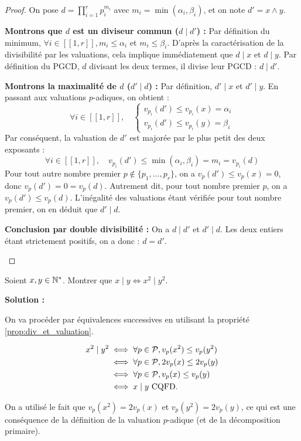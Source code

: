 \documentclass[12pt, a4paper]{report}
\begin{document}
\begin{proof}
    On pose $d = \prod_{i=1}^r p_i^{m_i}$ avec $m_i = \min(\alpha_i,\beta_i)$, et on note $d' = x \wedge y$.
    
    \begin{outline}
        \1 \textbf{Montrons que $d$ est un diviseur commun ($d \mid d'$) :}
            \2 Par définition du minimum, $\forall i \in [\![1, r]\!], m_i \le \alpha_i$ et $m_i \le \beta_i$.
            \2 D'après la caractérisation de la divisibilité par les valuations, cela implique immédiatement que $d \mid x$ et $d \mid y$.
            \2 Par définition du PGCD, $d$ divisant les deux termes, il divise leur PGCD : $d \mid d'$.

        \1 \textbf{Montrons la maximalité de $d$ ($d' \mid d$) :}
            \2 Par définition, $d' \mid x$ et $d' \mid y$. En passant aux valuations $p$-adiques, on obtient :
               \[ \forall i \in [\![1, r]\!], \quad \begin{cases} v_{p_i}(d') \le v_{p_i}(x) = \alpha_i \\ v_{p_i}(d') \le v_{p_i}(y) = \beta_i \end{cases} \]
            \2 Par conséquent, la valuation de $d'$ est majorée par le plus petit des deux exposants :
               \[ \forall i \in [\![1, r]\!], \quad v_{p_i}(d') \le \min(\alpha_i, \beta_i) = m_i = v_{p_i}(d) \]
            \2 Pour tout autre nombre premier $p \notin \{p_1, \dots, p_r\}$, on a $v_p(d') \le v_p(x) = 0$, donc $v_p(d') = 0 = v_p(d)$.
            \2 Autrement dit, pour tout nombre premier $p$, on a $v_p(d') \le v_p(d)$.
            \2 L'inégalité des valuations étant vérifiée pour tout nombre premier, on en déduit que $d' \mid d$.

        \1 \textbf{Conclusion par double divisibilité :}
            \2 On a $d \mid d'$ et $d' \mid d$. 
            \2 Les deux entiers étant strictement positifs, on a donc : $d = d'$.
    \end{outline}
\end{proof}

\begin{exercise}
    Soient $x,y \in \mathbb{N}^*$. Montrer que $x\mid y \iff x^2 \mid y^2$.

    \textbf{Solution :}

    On va procéder par équivalences successives en utilisant la propriété \ref{prop:div_et_valuation}.

    \begin{align*}
        x^2 \mid y^2 &\iff \forall p \in \mathcal{P}, v_p(x^2) \le v_p(y^2)\\
        &\iff \forall p \in \mathcal{P}, 2v_p(x) \le 2v_p(y)\\
        &\iff \forall p \in \mathcal{P}, v_p(x) \le v_p(y)\\
        &\iff x \mid y \text{ CQFD.}
    \end{align*}

    On a utilisé le fait que $v_p(x^2) = 2v_p(x)$ et $v_p(y^2) = 2v_p(y)$, ce qui est une conséquence de la définition de la valuation $p$-adique (et de la décomposition primaire).
\end{exercise}
\end{document}
